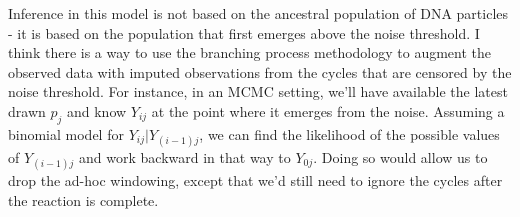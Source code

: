 \documentclass[12pt]{article}
\begin{document}
Inference in this model is not based on the ancestral population of DNA particles - it is based on the population that first emerges above the noise threshold. I think there is a way to use the branching process methodology to augment the observed data with imputed observations from the cycles that are censored by the noise threshold. For instance, in an MCMC setting, we'll have available the latest drawn $p_j$ and know $Y_{ij}$ at the point where it emerges from the noise. Assuming a binomial model for $Y_{ij} | Y_{(i-1)j}$, we can find the likelihood of the possible values of $Y_{(i-1)j}$ and work backward in that way to $Y_{0j}$. Doing so would allow us to drop the ad-hoc windowing, except that we'd still need to ignore the cycles after the reaction is complete.\\




\end{document}
